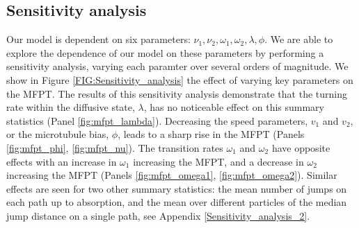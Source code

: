 \documentclass[twocolumn]{biophys}
\begin{document}
\subsection{Sensitivity analysis}
Our model is dependent on six parameters: $\nu_1, \nu_2, \omega_1, \omega_2, \lambda, \phi$. 
We are able to explore the dependence of our model on these parameters by performing a sensitivity analysis, varying each paramter over several orders of magnitude.
We show  in Figure \ref{FIG:Sensitivity_analysis} the effect of varying key parameters on the MFPT.
The results of this sensitivity analysis demonstrate that the turning rate within the diffusive state, $\lambda$, has no noticeable effect on this summary statistics (Panel \ref{fig:mfpt_lambda}).
Decreasing the speed parameters, $v_1$ and $v_2$, or the microtubule bias, $\phi$, leads to a sharp rise in the MFPT (Panels \ref{fig:mfpt_phi}, \ref{fig:mfpt_nu}). 
The transition rates $\omega_1$ and $\omega_2$ have opposite effects with an increase in $\omega_1$ increasing the MFPT, and a decrease in $\omega_2$ increasing the MFPT (Panels \ref{fig:mfpt_omega1}, \ref{fig:mfpt_omega2}). 
Similar effects are seen for two other summary statistics: the mean number of jumps on each path up to absorption, and the mean over different particles of the median jump distance on a single path, see Appendix \ref{Sensitivity_analysis_2}.
\end{document}
